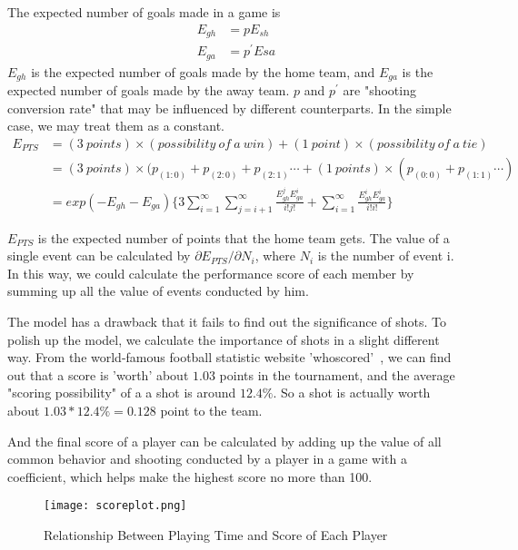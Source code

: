 \documentclass[12pt]{mcmthesis}
\begin{document}
The expected number of goals made in a game is
\begin{equation}
\begin{aligned}
E_{gh} &= pE_{sh}\nonumber\\
E_{ga} &= p^{'}E{sa}\nonumber
\end{aligned}
\end{equation}
$E_{gh}$ is the expected number of goals made by the home team, and $E_{ga}$ is the expected number of goals made by the away team. $p$ and $p^{'}$ are "shooting conversion rate" that may be influenced by different counterparts. In the simple case, we may treat them as a constant.
\begin{equation}
\begin{aligned}
E_{PTS} &= (3\ points) \times (possibility\ of\ a\ win) + (1\ point) \times (possibility\ of\ 					a\ tie)\\
&= (3\ points) \times (p_{(1:0)} + p_{(2:0)} + p_{(2:1)} \cdots + (1\ points) \times 
(p_{(0:0)} + p_{(1:1)} \cdots)\\
&= exp(- E_{gh} - E_{ga}) \{3\sum_{i=1}^{\infty}{\sum_{j=i+1}^{\infty}{\frac{E_{gh}^j E_{ga}^i}{i!j!}}} + \sum_{i=1}^{\infty}{\frac{E_{gh}^i E_{ga}^i}{i!i!}}\}
\end{aligned}
\end{equation}

$E_{PTS}$ is the expected number of points that the home team gets. The value of a single event can be calculated by $\partial E_{PTS} / \partial N_i$, where $N_{i}$ is the number of event i. In this way, we could calculate the performance score of each member by summing up all the value of events conducted by him.

The model has a drawback that it fails to find out the significance of shots. To polish up the model, we calculate the importance of shots in a slight different way. From the world-famous football statistic website 'whoscored'~\cite{score}, we can find out that a score is 'worth' about $1.03$ points in the tournament, and the average "scoring possibility" of a a shot is around $12.4\%$. So a shot is actually worth about $1.03 * 12.4\% = 0.128$ point to the team. 

And the final score of a player can be calculated by adding up the value of all common behavior and shooting conducted by a player in a game with a coefficient, which helps make the highest score no more than 100.
\begin{figure}[h]
	\centering
	\texttt{[image: scoreplot.png]}
	\caption{Relationship Between Playing Time and Score of Each Player}
	\label{fig:score_plot}
\end{figure}
\end{document}
